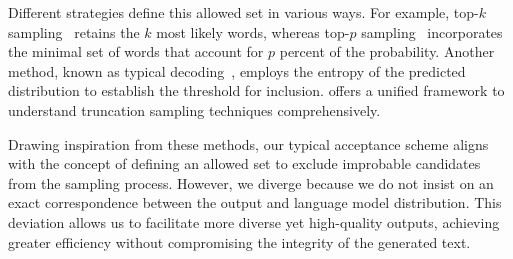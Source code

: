 Different strategies define this allowed set in various ways. For example, top-$k$ sampling~\citep{fan2018hierarchical} retains the $k$ most likely words, whereas top-$p$ sampling~\citep{holtzman2020curious} incorporates the minimal set of words that account for $p$ percent of the probability. Another method, known as typical decoding~\citep{meister2023locally}, employs the entropy of the predicted distribution to establish the threshold for inclusion. \citet{hewitt2022truncation} offers a unified framework to understand truncation sampling techniques comprehensively.

Drawing inspiration from these methods, our typical acceptance scheme aligns with the concept of defining an allowed set to exclude improbable candidates from the sampling process. However, we diverge because we do not insist on an exact correspondence between the output and language model distribution. This deviation allows us to facilitate more diverse yet high-quality outputs, achieving greater efficiency without compromising the integrity of the generated text.